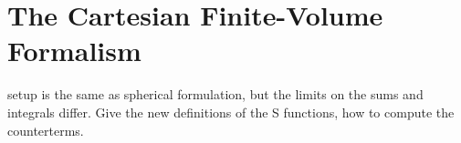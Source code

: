 \section{The Cartesian \Luscher Finite-Volume Formalism}\label{sec:formalism/cartesian}

setup is the same as spherical formulation, but the limits on the sums and integrals differ.  Give the new definitions of the S functions, how to compute the counterterms.
